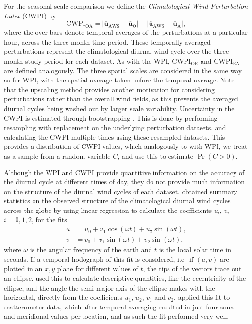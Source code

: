 \documentclass{ametsoc}
\DeclareMathOperator{\pr}{Pr}
\begin{document}
For the seasonal scale comparison we define the \textit{Climatological Wind Perturbation Index} (CWPI) by
\begin{equation}
\text{CWPI}_{\text{OA}} = \left\lvert \overline{\boldsymbol{u}}_{\text{AWS}}-\overline{\boldsymbol{u}}_{\text{O}} \right\rvert - \left\lvert \overline{\boldsymbol{u}}_{\text{AWS}}-\overline{\boldsymbol{u}}_{\text{A}} \right\rvert,
\end{equation}
where the over-bars denote temporal averages of the perturbations at a particular hour, across the three month time period. These temporally averaged perturbations represent the climatological diurnal wind cycle over the three month study period for each dataset. As with the WPI, $\text{CWPI}_{\text{OE}}$ and $\text{CWPI}_{\text{EA}}$ are defined analogously. The three spatial scales are considered in the same way as for WPI, with the spatial average taken before the temporal average. Note that the upscaling method provides another motivation for considering perturbations rather than the overall wind fields, as this prevents the averaged diurnal cycles being washed out by larger scale variability. Uncertainty in the CWPI is estimated through bootstrapping \citep{efron79}. This is done by performing resampling with replacement on the underlying perturbation datasets, and calculating the CWPI multiple times using these resampled datasets. This provides a distribution of CWPI values, which analogously to with WPI, we treat as a sample from a random variable $C$, and use this to estimate $\pr\left(C > 0\right)$.

Although the WPI and CWPI provide quantitive information on the accuracy of the diurnal cycle at different times of day, they do not provide much information on the structure of the diurnal wind cycles of each dataset. \citet{gille05} obtained summary statistics on the observed structure of the climatological diurnal wind cycles across the globe by using linear regression to calculate the coefficients $u_i$, $v_i$ $i=0,1,2$, for the fits 
\begin{align}
u &= u_0 + u_1 \cos(\omega t) + u_2 \sin(\omega t), \label{Eq:u_h} \\
v &= v_0 + v_1 \sin(\omega t) + v_2 \sin(\omega t), \label{Eq:v_h}
\end{align}
where $\omega$ is the angular frequency of the earth and $t$ is the local solar time in seconds. If a temporal hodograph of this fit is considered, i.e.~if $(u,v)$ are plotted in an $x,y$ plane for different values of $t$, the tips of the vectors trace out an ellipse. \citet{gille05} used this to calculate descriptive quantities, like the eccentricity of the ellipse, and the angle the semi-major axis of the ellipse makes with the horizontal, directly from the coefficients $u_1$, $u_2$, $v_1$ and $v_2$. \citet{gille05} applied this fit to scatterometer data, which after temporal averaging resulted in just four zonal and meridional values per location, and as such the fit performed very well.  
\end{document}
